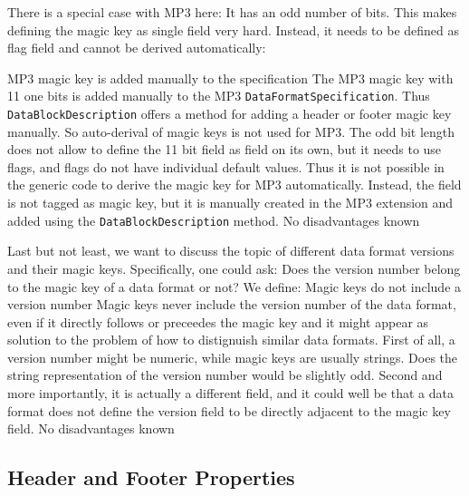 There is a special case with MP3 here: It has an odd number of bits. This makes defining the magic key as single field very hard. Instead, it needs to be defined as flag field and cannot be derived automatically:

{%
MP3 magic key is added manually to the specification
}
{%
The MP3 magic key with 11 one bits is added manually to the MP3 \texttt{DataFormatSpecification}. Thus \texttt{DataBlockDescription} offers a method for adding a header or footer magic key manually. So auto-derival of magic keys is not used for MP3.
}
{%
The odd bit length does not allow to define the 11 bit field as field on its own, but it needs to use flags, and flags do not have individual default values. Thus it is not possible in the generic code to derive the magic key for MP3 automatically. Instead, the field is not tagged as magic key, but it is manually created in the MP3 extension and added using the \texttt{DataBlockDescription} method.
}
{%
No disadvantages known
}

Last but not least, we want to discuss the topic of different data format versions and their magic keys. Specifically, one could ask: Does the version number belong to the magic key of a data format or not? We define:
{%
Magic keys do not include a version number
}
{%
Magic keys never include the version number of the data format, even if it directly follows or preceedes the magic key and it might appear as solution to the problem of how to distignuish similar data formats.
}
{%
First of all, a version number might be numeric, while magic keys are usually strings. Does the string representation of the version number would be slightly odd. Second and more importantly, it is actually a different field, and it could well be that a data format does not define the version field to be directly adjacent to the magic key field.
}
{%
No disadvantages known
}

\subsection{Header and Footer Properties}%
\label{sec:HeaderProperties}%


